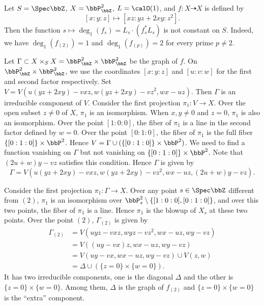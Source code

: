   \begin{example}\label{eg:non-continuity-of-mixed-degrees}
    Let $S = \Spec \bbZ$, $X = \bbP^2_{\bbZ}$, $L = \calO(1)$, and $f: X \dashrightarrow X$ is defined by
    \[ [x:y:z] \mapsto [xz:yz+2xy:z^2]. \]
    Then the function $s \mapsto \deg_1(f_s) = L_s \cdot (f_s^*L_s)$ is not constant on $S$.
    Indeed, we have $\deg_1(f_{(2)}) = 1$ and $\deg_1(f_{(p)}) = 2$ for every prime $p \neq 2$.
    
    Let $\Gamma \subset X \times_S X = \bbP^2_{\bbZ} \times \bbP^2_{\bbZ}$ be the graph of $f$.
    On $\bbP^2_{\bbZ} \times \bbP^2_{\bbZ}$, we use the coordinates $[x:y:z]$ and $[u:v:w]$ for the first and second factor respectively.
    Set $V = V(u(yz+2xy) - vxz, w(yz+2xy) - vz^2, wx - uz)$.
    Then $\Gamma$ is an irreducible component of $V$.
    Consider the first projection $\pi_1: V \to X$.
    Over the open subset $z \neq 0$ of $X$, $\pi_1$ is an isomorphism.
    When $x,y \neq 0$ and $z = 0$, $\pi_1$ is also an isomorphism.
    Over the point $[1:0:0]$, the fiber of $\pi_1$ is a line in the second factor defined by $w = 0$.
    Over the point $[0:1:0]$, the fiber of $\pi_1$ is the full fiber $\{[0:1:0]\} \times \bbP^2$.
    Hence $V = \Gamma \cup (\{[0:1:0]\} \times \bbP^2)$.
    We need to find a function vanishing on $\Gamma$ but not vanishing on $\{[0:1:0]\} \times \bbP^2$.
    Note that $(2u+w)y-vz$ satisfies this condition.
    Hence $\Gamma$ is given by 
    \[ \Gamma = V(u(yz+2xy) - vxz, w(yz+2xy) - vz^2, wx - uz, (2u+w)y-vz). \]

    Consider the first projection $\pi_1: \Gamma \to X$.
    Over any point $s \in \Spec \bbZ$ different from $(2)$, $\pi_1$ is an isomorphism over $\bbP^2_s \setminus \{[1:0:0],[0:1:0]\}$, and over this two points, the fiber of $\pi_1$ is a line.
    Hence $\pi_1$ is the blowup of $X_s$ at these two points.
    Over the point $(2)$, $\Gamma_{(2)}$ is given by 
    \begin{align*}
      \Gamma_{(2)} & =  V(uyz - vxz, wyz - vz^2, wx - uz, wy-vz) \\
        &= V((uy-vx)z, wx - uz, wy-vz) \\
        &= V(uy-vx, wx - uz, wy-vz) \cup V(z, w) \\
        &= \Delta \cup (\{z=0\} \times \{w=0\}).
    \end{align*}
    It has two irreducible components, one is the diagonal $\Delta$ and the other is $\{z=0\} \times \{w=0\}$.
    Among them, $\Delta$ is the graph of $f_{(2)}$ and $\{z=0\} \times \{w=0\}$ is the ``extra'' component.
  \end{example}


